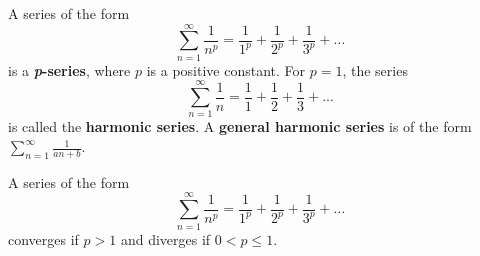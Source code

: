 \documentclass[addpoints, 12pt]{exam}
\begin{document}
\newpage

\begin{tcolorbox}[title= DEFINITION OF A $p$-SERIES,colframe=black,sharp corners,colback=white,colbacktitle=white,coltitle=black]

    A series of the form \[\displaystyle\sum_{n=1}^\infty \frac{1}{n^p}=\frac{1}{1^p}+\frac{1}{2^p}+\frac{1}{3^p}+...\] is a \textbf{\textit{p}-series}, where $p$ is a positive constant. For $p=1$, the series \[\sum_{n=1}^\infty\frac{1}{n}=\frac{1}{1}+\frac{1}{2}+\frac{1}{3}+...\]
    is called the \textbf{harmonic series}. A \textbf{general harmonic series} is of the form $\displaystyle\sum_{n=1}^\infty\frac{1}{an+b}$.

\end{tcolorbox}
\begin{tcolorbox}[title= CONVERGENCE OF A $p$-SERIES,colframe=black,sharp corners,colback=white,colbacktitle=white,coltitle=black]

    A series of the form \[\displaystyle\sum_{n=1}^\infty \frac{1}{n^p}=\frac{1}{1^p}+\frac{1}{2^p}+\frac{1}{3^p}+...\] converges if $p>1$ and diverges if $0<p\le1$.

\end{tcolorbox}
\vspace{.1cm}
\end{document}
